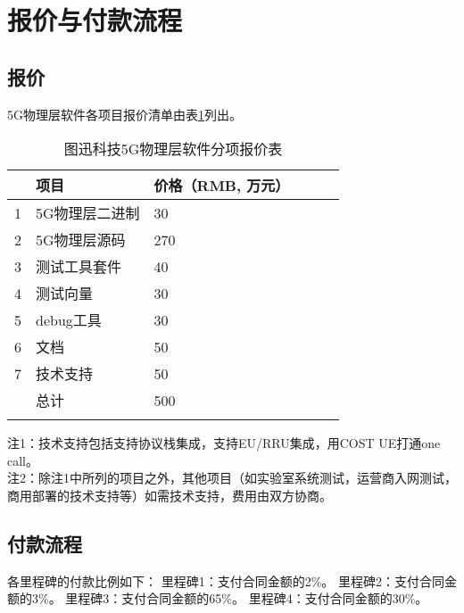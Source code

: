 \section{报价与付款流程}
\subsection{报价}
5G物理层软件各项目报价清单由表\ref{T.3_2}列出。
\begin{table}[H]
  \centering
  \caption{图迅科技5G物理层软件分项报价表}
  \label{T.3_2}
  \begin{tabular}{llllll}
      \hline
        & 项目  & 价格（RMB, 万元）   \\
      \hline
      1 & 5G物理层二进制 & 30  \\
      \hline
      2 & 5G物理层源码 & 270  \\
      \hline
      3 & 测试工具套件 & 40  \\
      \hline
      4 & 测试向量 & 30 \\
      \hline
      5 & debug工具 & 30\\
      \hline
      6 & 文档 & 50\\
      \hline
      7 & 技术支持 & 50\\
      \hline
      & 总计   &   500  \\
      \hline{}
  \end{tabular}
\end{table}

注1：技术支持包括支持协议栈集成，支持EU/RRU集成，用COST UE打通one call。\\
\newline
\setlength{\hangindent}{2em}
注2：除注1中所列的项目之外，其他项目（如实验室系统测试，运营商入网测试，商用部署的技术支持等）如需技术支持，费用由双方协商。

\subsection{付款流程}
各里程碑的付款比例如下：
\newline
\setlength{\hangindent}{2em}
里程碑1：支付合同金额的2\%。
\newline
\setlength{\hangindent}{2em}
里程碑2：支付合同金额的3\%。
\newline
\setlength{\hangindent}{2em}
里程碑3：支付合同金额的65\%。
\newline
\setlength{\hangindent}{2em}
里程碑4：支付合同金额的30\%。
\newline
\setlength{\hangindent}{2em}

